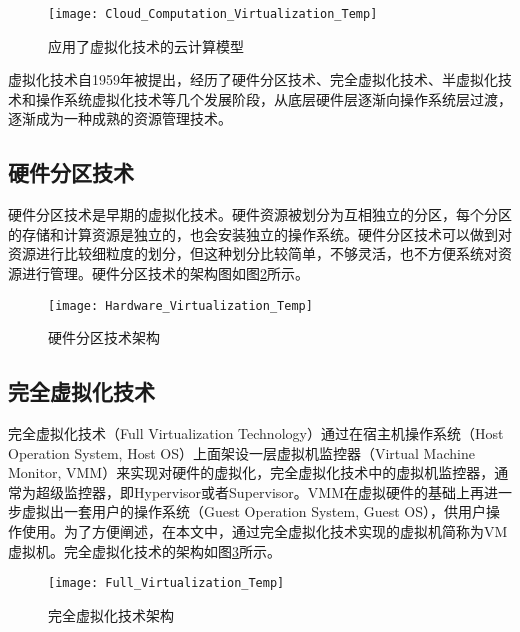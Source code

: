 \begin{figure}[!htbp]
    \centering
    \texttt{[image: Cloud\_Computation\_Virtualization\_Temp]}
    \caption{应用了虚拟化技术的云计算模型}
    \label{fig:cloud_computation_virtualization}
\end{figure}

虚拟化技术自1959年被提出，经历了硬件分区技术、完全虚拟化技术、半虚拟化技术和操作系统虚拟化技术等几个发展阶段\cite{肖伟民2019嵌入式虚拟化}，从底层硬件层逐渐向操作系统层过渡，逐渐成为一种成熟的资源管理技术。

\subsection{硬件分区技术}

硬件分区技术是早期的虚拟化技术。硬件资源被划分为互相独立的分区，每个分区的存储和计算资源是独立的，也会安装独立的操作系统\cite{plessl2004virtualization}。硬件分区技术可以做到对资源进行比较细粒度的划分，但这种划分比较简单，不够灵活，也不方便系统对资源进行管理。硬件分区技术的架构图如图\ref{fig:hardware_virtualization}所示\cite{肖伟民2019嵌入式虚拟化}。

\begin{figure}[!htbp]
    \centering
    \texttt{[image: Hardware\_Virtualization\_Temp]}
    \caption{硬件分区技术架构}
    \label{fig:hardware_virtualization}
\end{figure}

\subsection{完全虚拟化技术}

完全虚拟化技术（Full Virtualization Technology）通过在宿主机操作系统（Host Operation System, Host OS）上面架设一层虚拟机监控器（Virtual Machine Monitor, VMM）\citep{li2017performance}来实现对硬件的虚拟化，完全虚拟化技术中的虚拟机监控器，通常为超级监控器，即Hypervisor或者Supervisor\citep{kolhe2012comparative}\citep{leite2012performance}。VMM在虚拟硬件的基础上再进一步虚拟出一套用户的操作系统（Guest Operation System, Guest OS），供用户操作使用。为了方便阐述，在本文中，通过完全虚拟化技术实现的虚拟机简称为VM虚拟机。完全虚拟化技术的架构如图\ref{fig:full_virtualization}所示\citep{oludele2014evolution}。

\begin{figure}[!htbp]
    \centering
    \texttt{[image: Full\_Virtualization\_Temp]}
    \caption{完全虚拟化技术架构}
    \label{fig:full_virtualization}
\end{figure}

